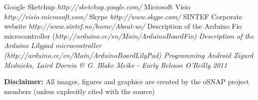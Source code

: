 \begin{thebibliography}{99}
 Google Sketchup {\em http://sketchup.google.com/}
 Microsoft Visio {\em http://visio.microsoft.com/}
 Skype {\em http://www.skype.com/}
 SINTEF Corporate website {\em http://www.sintef.no/home/About-us/}
 Description of the Arduino Fio microcontroller (\em http://arduino.cc/en/Main/ArduinoBoardFio)
  Description of the Arduino Lilypad microcontroller (\em http://arduino.cc/en/Main/ArduinoBoardLilyPad)
 Programming Android {\em Zigurd Mednieks, Laird Dornin \& G. Blake Meike - Early Release O'Reilly 2011 }
\end{thebibliography}


\textbf{Disclaimer:}
All images, figures and graphics are created by the oSNAP project members (unless explecitly cited with the source)
